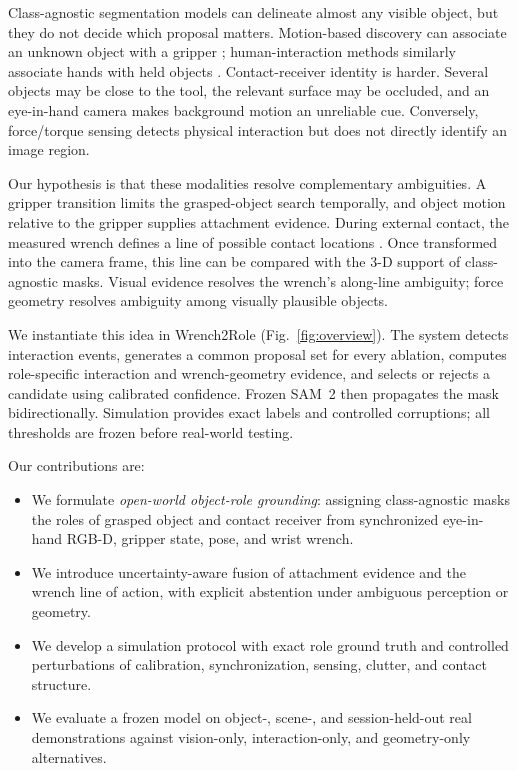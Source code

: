 \documentclass[letterpaper,10pt,journal,twoside]{IEEEtran}
\newcommand{\method}{Wrench2Role}
\begin{document}
Class-agnostic segmentation models can delineate almost any visible object, but
they do not decide which proposal matters. Motion-based discovery can associate
an unknown object with a gripper \cite{boerdijk2021whats}; human-interaction
methods similarly associate hands with held objects
\cite{higgins2023moves,narasimhaswamy2024hoist}. Contact-receiver identity is
harder. Several objects may be close to the tool, the relevant surface may be
occluded, and an eye-in-hand camera makes background motion an unreliable cue.
Conversely, force/torque sensing detects physical interaction but does not
directly identify an image region.

Our hypothesis is that these modalities resolve complementary ambiguities. A
gripper transition limits the grasped-object search temporally, and object
motion relative to the gripper supplies attachment evidence. During external
contact, the measured wrench defines a line of possible contact locations
\cite{bicchi1990}. Once transformed into the camera frame, this line can be
compared with the 3-D support of class-agnostic masks. Visual evidence resolves
the wrench's along-line ambiguity; force geometry resolves ambiguity among
visually plausible objects.

We instantiate this idea in \method{} (Fig.~\ref{fig:overview}). The system
detects interaction events, generates a common proposal set for every ablation,
computes role-specific interaction and wrench-geometry evidence, and selects or
rejects a candidate using calibrated confidence. Frozen SAM~2
\cite{ravi2024sam2} then propagates the mask bidirectionally. Simulation
provides exact labels and controlled corruptions; all thresholds are frozen
before real-world testing.

Our contributions are:
\begin{itemize}
  \item We formulate \emph{open-world object-role grounding}: assigning
  class-agnostic masks the roles of grasped object and contact receiver from
  synchronized eye-in-hand RGB-D, gripper state, pose, and wrist wrench.
  \item We introduce uncertainty-aware fusion of attachment evidence and the
  wrench line of action, with explicit abstention under ambiguous perception or
  geometry.
  \item We develop a simulation protocol with exact role ground truth and
  controlled perturbations of calibration, synchronization, sensing, clutter,
  and contact structure.
  \item We evaluate a frozen model on object-, scene-, and session-held-out real
  demonstrations against vision-only, interaction-only, and geometry-only
  alternatives.
\end{itemize}
\end{document}
